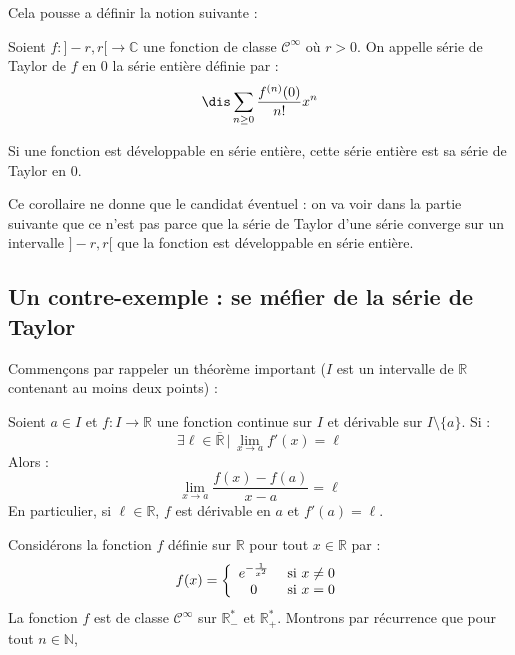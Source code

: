 \documentclass[a4paper,10pt]{report}
\begin{document}
\noindent Cela pousse a définir la notion suivante :

\begin{defin}
Soient $f : ]-r,r[ \rightarrow \mathbb{C}$ une fonction de classe $\mathcal{C}^{\infty}$ où $r>0$. On appelle série de Taylor de $f$ en $0$ la série entière définie par :
$$ \dis \sum_{n \geq 0} \frac{f^{(n)}(0)}{n!} x^n$$
\end{defin}

\begin{cor} Si une fonction est développable en série entière, cette série entière est sa série de Taylor en $0$.
\end{cor}

\begin{att} Ce corollaire ne donne que le candidat éventuel : on va voir dans la partie suivante que ce n'est pas parce que la série de Taylor d'une série converge sur un intervalle $]-r,r[$ que la fonction est développable en série entière.
\end{att}

\subsection{Un contre-exemple : se méfier de la série de Taylor}

\noindent Commençons par rappeler un théorème important ($I$ est un intervalle de $\mathbb{R}$ contenant au moins deux points) :

\begin{thm} Soient $a \in I$ et $f : I \rightarrow \mathbb{R}$ une fonction continue sur $I$ et dérivable sur $I \setminus \lbrace a \rbrace$. Si :
$$ \exists \ell \in \overline{\mathbb{R}} \, \vert \, \lim_{x \rightarrow a} f'(x) = \ell$$
Alors :
$$ \lim_{x \rightarrow a } \dfrac{f(x)-f(a)}{x-a} = \ell$$
En particulier, si $\ell \in \mathbb{R}$, $f$ est dérivable en $a$ et $f'(a)= \ell$.
\end{thm}

\noindent Considérons la fonction $f$ définie sur $\mathbb{R}$ pour tout $x \in \mathbb{R}$ par :
$$ f(x) = \left\lbrace \begin{array}{cl}
e^{- \frac{1}{x^2} } & \hbox{ si } x \neq 0 \\
0 & \hbox{ si } x=0\\
\end{array}\right.$$
La fonction $f$ est de classe $\mathcal{C}^{\infty}$ sur $\mathbb{R}_{-}^{*}$ et $\mathbb{R}_{+}^{*}$. Montrons par récurrence que pour tout $n \in \mathbb{N}$,
\end{document}
